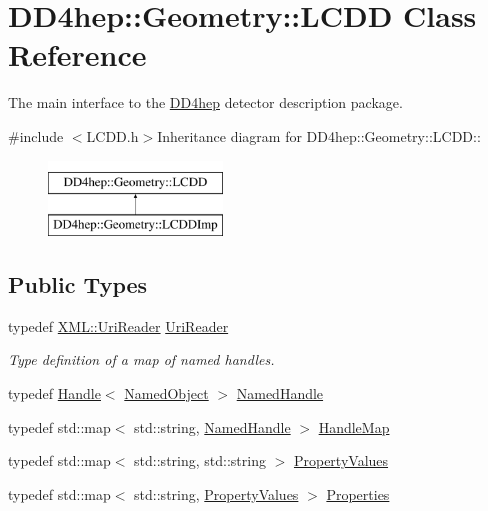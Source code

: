 \hypertarget{class_d_d4hep_1_1_geometry_1_1_l_c_d_d}{
\section{DD4hep::Geometry::LCDD Class Reference}
\label{class_d_d4hep_1_1_geometry_1_1_l_c_d_d}
}


The main interface to the \hyperlink{namespace_d_d4hep}{DD4hep} detector description package.  


{\ttfamily \#include $<$LCDD.h$>$}Inheritance diagram for DD4hep::Geometry::LCDD::\begin{figure}[H]
\begin{center}
\leavevmode
\includegraphics[height=2cm]{class_d_d4hep_1_1_geometry_1_1_l_c_d_d}
\end{center}
\end{figure}
\subsection*{Public Types}
\begin{DoxyCompactItemize}
\item 
typedef \hyperlink{class_d_d4hep_1_1_x_m_l_1_1_uri_reader}{XML::UriReader} \hyperlink{class_d_d4hep_1_1_geometry_1_1_l_c_d_d_a69f1e3e4fbcef1d57f1df1c2bd85918f}{UriReader}
\begin{DoxyCompactList}\small\item\em Type definition of a map of named handles. \item\end{DoxyCompactList}\item 
typedef \hyperlink{class_d_d4hep_1_1_handle}{Handle}$<$ \hyperlink{class_d_d4hep_1_1_named_object}{NamedObject} $>$ \hyperlink{class_d_d4hep_1_1_geometry_1_1_l_c_d_d_a5502368683a5c78c91e9f814ff72b705}{NamedHandle}
\item 
typedef std::map$<$ std::string, \hyperlink{class_d_d4hep_1_1_handle}{NamedHandle} $>$ \hyperlink{class_d_d4hep_1_1_geometry_1_1_l_c_d_d_a05cb11e7355772c7b0794bcca59bf477}{HandleMap}
\item 
typedef std::map$<$ std::string, std::string $>$ \hyperlink{class_d_d4hep_1_1_geometry_1_1_l_c_d_d_a2a0388e0d76c73a3582439953ac3be53}{PropertyValues}
\item 
typedef std::map$<$ std::string, \hyperlink{class_d_d4hep_1_1_geometry_1_1_l_c_d_d_a2a0388e0d76c73a3582439953ac3be53}{PropertyValues} $>$ \hyperlink{class_d_d4hep_1_1_geometry_1_1_l_c_d_d_a89096744868821bf5dcb0c0560b348c9}{Properties}
\end{DoxyCompactItemize}
